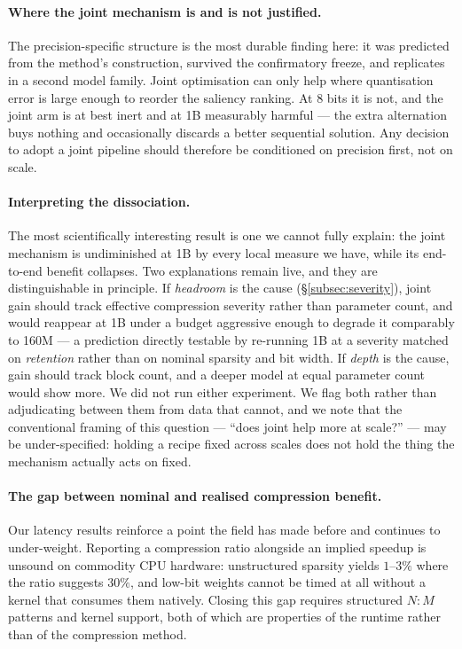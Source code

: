 \paragraph{Where the joint mechanism is and is not justified.} The precision-specific
structure is the most durable finding here: it was predicted from the method's construction,
survived the confirmatory freeze, and replicates in a second model family. Joint optimisation
can only help where quantisation error is large enough to reorder the saliency ranking. At 8
bits it is not, and the joint arm is at best inert and at 1B measurably harmful --- the extra
alternation buys nothing and occasionally discards a better sequential solution. Any decision
to adopt a joint pipeline should therefore be conditioned on precision first, not on scale.

\paragraph{Interpreting the dissociation.} The most scientifically interesting result is one
we cannot fully explain: the joint mechanism is undiminished at 1B by every local measure we
have, while its end-to-end benefit collapses. Two explanations remain live, and they are
distinguishable in principle. If \emph{headroom} is the cause (\S\ref{subsec:severity}), joint
gain should track effective compression severity rather than parameter count, and would
reappear at 1B under a budget aggressive enough to degrade it comparably to 160M --- a
prediction directly testable by re-running 1B at a severity matched on \emph{retention}
rather than on nominal sparsity and bit width. If \emph{depth} is the cause, gain should track
block count, and a deeper model at equal parameter count would show more. We did not run
either experiment. We flag both rather than adjudicating between them from data that cannot,
and we note that the conventional framing of this question --- ``does joint help more at
scale?'' --- may be under-specified: holding a recipe fixed across scales does not hold the
thing the mechanism actually acts on fixed.

\paragraph{The gap between nominal and realised compression benefit.} Our latency results
reinforce a point the field has made before and continues to under-weight. Reporting a
compression ratio alongside an implied speedup is unsound on commodity CPU hardware:
unstructured sparsity yields $1$--$3\%$ where the ratio suggests $30\%$, and low-bit weights
cannot be timed at all without a kernel that consumes them natively. Closing this gap
requires structured $N{:}M$ patterns and kernel support, both of which are properties of the
runtime rather than of the compression method.


